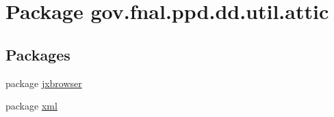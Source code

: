 \hypertarget{namespacegov_1_1fnal_1_1ppd_1_1dd_1_1util_1_1attic}{\section{Package gov.\-fnal.\-ppd.\-dd.\-util.\-attic}
\label{namespacegov_1_1fnal_1_1ppd_1_1dd_1_1util_1_1attic}
}
\subsection*{Packages}
\begin{DoxyCompactItemize}
\item 
package \hyperlink{namespacegov_1_1fnal_1_1ppd_1_1dd_1_1util_1_1attic_1_1jxbrowser}{jxbrowser}
\item 
package \hyperlink{namespacegov_1_1fnal_1_1ppd_1_1dd_1_1util_1_1attic_1_1xml}{xml}
\end{DoxyCompactItemize}
